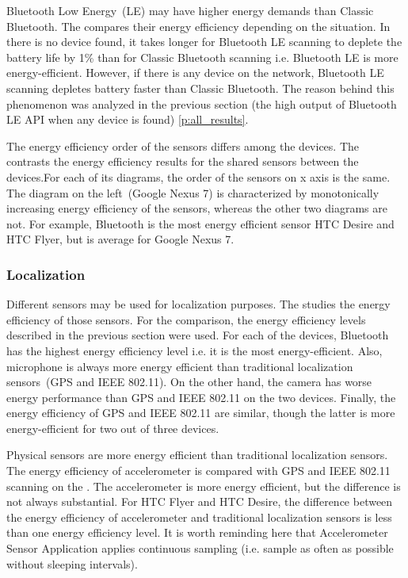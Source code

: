 Bluetooth Low Energy\ (LE) may have higher energy demands than Classic Bluetooth. The  compares their energy efficiency depending on the situation. In there is no device found, it takes longer for Bluetooth LE scanning to deplete the battery life by 1\% than for Classic Bluetooth scanning i.e. Bluetooth LE is more energy-efficient. However, if there is any device on the network, Bluetooth LE scanning depletes battery faster than Classic Bluetooth. The reason behind this phenomenon was analyzed in the previous section (the high output of Bluetooth LE API when any device is found) \ref{p:all_results}.
	
				
The energy efficiency order of the sensors differs among the devices. The  contrasts the energy efficiency results for the shared sensors between the devices.For each of its diagrams, the order of the sensors on x axis is the same. The diagram on the left\ (Google Nexus 7) is characterized by monotonically increasing energy efficiency of the sensors, whereas the other two diagrams are not. For example, Bluetooth is the most energy efficient sensor HTC Desire and HTC Flyer, but is average for Google Nexus 7.

		
\subsubsection{Localization}

\hspace{10pt} Different sensors may be used for localization purposes. The  studies the energy efficiency of those sensors. For the comparison, the energy efficiency levels described in the previous section were used. For each of the devices, Bluetooth has the highest energy efficiency level i.e. it is the most energy-efficient. Also, microphone is always more energy efficient than traditional localization sensors\ (GPS and IEEE 802.11). On the other hand, the camera has worse energy performance than GPS and IEEE 802.11 on the two devices. Finally, the energy efficiency of GPS and IEEE 802.11 are similar, though the latter is more energy-efficient for two out of three devices.  	


Physical sensors are more energy efficient than traditional localization sensors. The energy efficiency of accelerometer is compared with GPS and IEEE 802.11 scanning on the . The accelerometer is more energy efficient, but the difference is not always substantial. For HTC Flyer and HTC Desire, the difference between the energy efficiency of accelerometer and traditional localization sensors is less than one energy efficiency level. It is worth reminding here that Accelerometer Sensor Application applies continuous sampling (i.e. sample as often as possible without sleeping intervals).
	
